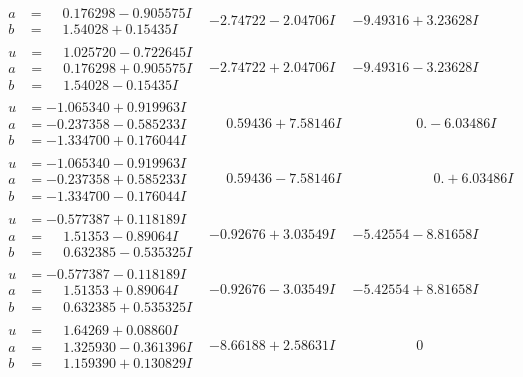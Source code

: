 \documentclass[1p]{elsarticle_modified}
\theoremstyle{definition}
\begin{document}
$$\begin{array}{c|c|c}
\begin{aligned}
a &= \phantom{-}0.176298 - 0.905575 I \\
b &= \phantom{-}1.54028 + 0.15435 I\end{aligned}
 & -2.74722 - 2.04706 I & -9.49316 + 3.23628 I \\ \hline\begin{aligned}
u &= \phantom{-}1.025720 - 0.722645 I \\
a &= \phantom{-}0.176298 + 0.905575 I \\
b &= \phantom{-}1.54028 - 0.15435 I\end{aligned}
 & -2.74722 + 2.04706 I & -9.49316 - 3.23628 I \\ \hline\begin{aligned}
u &= -1.065340 + 0.919963 I \\
a &= -0.237358 - 0.585233 I \\
b &= -1.334700 + 0.176044 I\end{aligned}
 & \phantom{-}0.59436 + 7.58146 I & \phantom{-0.000000 } 0. - 6.03486 I \\ \hline\begin{aligned}
u &= -1.065340 - 0.919963 I \\
a &= -0.237358 + 0.585233 I \\
b &= -1.334700 - 0.176044 I\end{aligned}
 & \phantom{-}0.59436 - 7.58146 I & \phantom{-0.000000 -}0. + 6.03486 I \\ \hline\begin{aligned}
u &= -0.577387 + 0.118189 I \\
a &= \phantom{-}1.51353 - 0.89064 I \\
b &= \phantom{-}0.632385 - 0.535325 I\end{aligned}
 & -0.92676 + 3.03549 I & -5.42554 - 8.81658 I \\ \hline\begin{aligned}
u &= -0.577387 - 0.118189 I \\
a &= \phantom{-}1.51353 + 0.89064 I \\
b &= \phantom{-}0.632385 + 0.535325 I\end{aligned}
 & -0.92676 - 3.03549 I & -5.42554 + 8.81658 I \\ \hline\begin{aligned}
u &= \phantom{-}1.64269 + 0.08860 I \\
a &= \phantom{-}1.325930 - 0.361396 I \\
b &= \phantom{-}1.159390 + 0.130829 I\end{aligned}
 & -8.66188 + 2.58631 I & \phantom{-0.000000 } 0 \\ \hline\begin{aligned}

\end{aligned}
\end{array}$$
\end{document}

